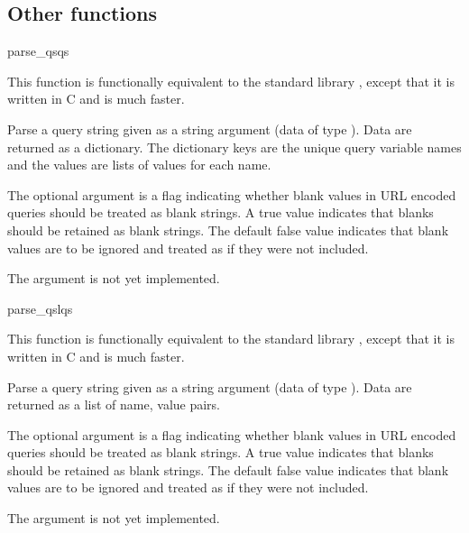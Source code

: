 \subsection{Other functions\label{pyapi-util-funcs}}

\begin{funcdesc}{parse_qs}{qs}

  This function is functionally equivalent to the standard library
   , except that it is written in C and is
  much faster. 

  Parse a query string given as a string argument (data of type
  ).  Data are
  returned as a dictionary.  The dictionary keys are the unique query
  variable names and the values are lists of values for each name.

  The optional argument  is a flag indicating
  whether blank values in URL encoded queries should be treated as blank
  strings.  A true value indicates that blanks should be retained as
  blank strings.  The default false value indicates that blank values
  are to be ignored and treated as if they were not included.

  \begin{notice}
    The  argument is not yet implemented.
  \end{notice}

\end{funcdesc}


\begin{funcdesc}{parse_qsl}{qs}

  This function is functionally equivalent to the standard library
   , except that it is written in C and is
  much faster. 

  Parse a query string given as a string argument (data of type
  ).  Data are
  returned as a list of name, value pairs.

  The optional argument  is a flag indicating
  whether blank values in URL encoded queries should be treated as blank
  strings.  A true value indicates that blanks should be retained as
  blank strings.  The default false value indicates that blank values
  are to be ignored and treated as if they were not included.

  \begin{notice}
    The  argument is not yet implemented.
  \end{notice}

\end{funcdesc}


